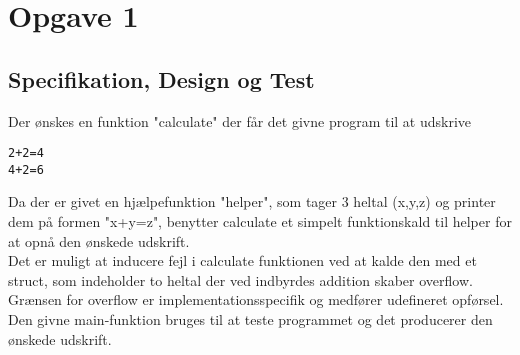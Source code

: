 \section{Opgave 1}
\subsection{Specifikation, Design og Test}
	Der ønskes en funktion "calculate" der får det givne program til at udskrive
\begin{lstlisting}[caption=Ønsket output fra exam.c]
2+2=4
4+2=6
\end{lstlisting}

Da der er givet en hjælpefunktion "helper", som tager 3 heltal (x,y,z) og printer dem på formen "x+y=z", benytter calculate et simpelt funktionskald til helper for at opnå den ønskede udskrift. \\

Det er muligt at inducere fejl i calculate funktionen ved at kalde den med et struct, som indeholder to heltal der ved indbyrdes addition skaber overflow. Grænsen for overflow er implementationsspecifik og medfører udefineret opførsel.\\
	

Den givne main-funktion bruges til at teste programmet og det producerer den ønskede udskrift.